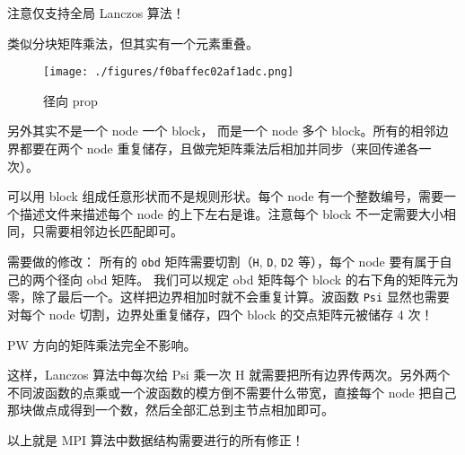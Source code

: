 

注意仅支持全局 Lanczos 算法！

类似分块矩阵乘法，但其实有一个元素重叠。
\begin{figure}[ht]
\centering
\texttt{[image: ./figures/f0baffec02af1adc.png]}
\caption{径向 prop} \label{fig_HeMPI_1}
\end{figure}
另外其实不是一个 node 一个 block， 而是一个 node 多个 block。所有的相邻边界都要在两个 node 重复储存，且做完矩阵乘法后相加并同步（来回传递各一次）。

可以用 block 组成任意形状而不是规则形状。每个 node 有一个整数编号，需要一个描述文件来描述每个 node 的上下左右是谁。注意每个 block 不一定需要大小相同，只需要相邻边长匹配即可。

需要做的修改： 所有的 \verb`obd` 矩阵需要切割（\verb`H`, \verb`D`, \verb`D2` 等），每个 node 要有属于自己的两个径向 obd 矩阵。 我们可以规定 obd 矩阵每个 block 的右下角的矩阵元为零，除了最后一个。这样把边界相加时就不会重复计算。波函数 \verb`Psi` 显然也需要对每个 node 切割，边界处重复储存，四个 block 的交点矩阵元被储存 4 次！

PW 方向的矩阵乘法完全不影响。

这样，Lanczos 算法中每次给 Psi 乘一次 H 就需要把所有边界传两次。另外两个不同波函数的点乘或一个波函数的模方倒不需要什么带宽，直接每个 node 把自己那块做点成得到一个数，然后全部汇总到主节点相加即可。

以上就是 MPI 算法中数据结构需要进行的所有修正！
